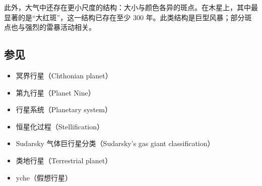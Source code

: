 此外，大气中还存在更小尺度的结构：大小与颜色各异的斑点。在木星上，其中最显著的是“大红斑”，这一结构已存在至少 300 年。此类结构是巨型风暴；部分斑点也与强烈的雷暴活动相关。
\subsection{参见}  
\begin{itemize}
\item 冥界行星（Chthonian planet）  
\item 第九行星（Planet Nine）  
\item 行星系统（Planetary system）  
\item 恒星化过程（Stellification）  
\item Sudarsky 气体巨行星分类（Sudarsky's gas giant classification）  
\item 类地行星（Terrestrial planet）  
\item yche（假想行星）
\end{itemize}
